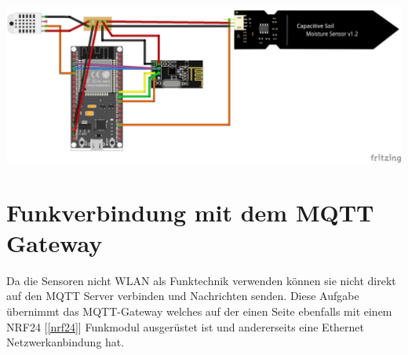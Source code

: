 \documentclass[
  12pt, %
  a4paper, %
  twoside, %
  openany, %
  numbers=noenddot, %
  BCOR=5mm, %
  parskip=half*, %
  thesis, %
]{bfhbook}
\begin{document}
  \begin{center}
    \includegraphics[width=17cm, left]{Bilder/Sensor-Design_Steckplatine.png}
    \captionsetup{justification=centering}
   \end{center}


 \section{Funkverbindung mit dem MQTT Gateway}
 Da die Sensoren nicht WLAN als Funktechnik verwenden können sie nicht direkt auf den MQTT Server verbinden und Nachrichten senden. Diese Aufgabe übernimmt das MQTT-Gateway welches auf der einen Seite ebenfalls mit einem NRF24 [\ref{nrf24}] Funkmodul ausgerüstet ist und andererseits eine Ethernet Netzwerkanbindung hat.
 
\end{document}
